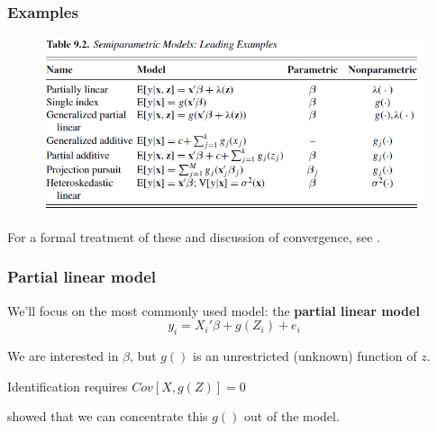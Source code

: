 \begin{frame}
  \frametitle{Examples}
  
  \begin{figure}[htbp]
    \begin{center}
    \includegraphics[width=\textwidth]{./resources/CTSemiPExamples}
    \label{loclinear2}
    \end{center}
  \end{figure}

  For a formal treatment of these and discussion of convergence, see \cite{powell_chapter_1994}.
\end{frame}

\begin{frame}
  \frametitle{Partial linear model}
  We'll focus on the most commonly used model: the \textbf{partial linear model} 
  $$ y_i = X_i'\beta + g(Z_i) + e_i $$ 
  
  We are interested in $\beta$, but $g()$ is an unrestricted (unknown) function of $z$. 

  Identification requires $Cov[X,g(Z)]=0$ 

  \citet{robinson_root-n-consistent_1988} showed that we can concentrate this $g()$ out of the model. 

\end{frame}

